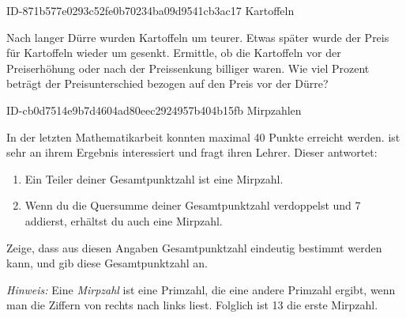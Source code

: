 \begin{exercise}
      {ID-871b577e0293c52fe0b70234ba09d9541cb3ac17}
      {Kartoffeln}
  \ifproblem\problem\par
    Nach langer Dürre wurden Kartoffeln um
     teurer. Etwas später wurde der
    Preis für Kartoffeln wieder um 
    gesenkt. Ermittle, ob die Kartoffeln vor
    der Preiserhöhung oder nach der Preissenkung
    billiger waren. Wie viel Prozent beträgt
    der Preisunterschied bezogen auf den
    Preis vor der Dürre?
  \fi
\end{exercise}

\begin{exercise}
      {ID-cb0d7514e9b7d4604ad80eec2924957b404b15fb}
      {Mirpzahlen}
  \ifproblem\problem\par
    In der letzten Mathematikarbeit konnten maximal
    \num{40} Punkte erreicht werden. \xxa{} ist sehr
    an ihrem Ergebnis interessiert und fragt ihren
    Lehrer.  Dieser antwortet:
    \begin{enumerate}[(1)]
      \item \glqq Ein Teiler deiner Gesamtpunktzahl
            ist eine Mirpzahl.\grqq
      \item \glqq Wenn du die Quersumme deiner
            Gesamtpunktzahl verdoppelst und 7
            addierst, erhältst du auch eine
            Mirpzahl.\grqq
    \end{enumerate}
    Zeige, dass aus diesen Angaben \xxa{}
    Gesamtpunktzahl eindeutig bestimmt werden kann,
    und gib diese Gesamtpunktzahl an.\par
    \emph{Hinweis:} Eine \emph{Mirpzahl} ist eine
    Primzahl, die eine andere Primzahl ergibt, wenn
    man die Ziffern von rechts nach links liest.
    Folglich ist 13 die erste Mirpzahl.
  \fi
\end{exercise}

